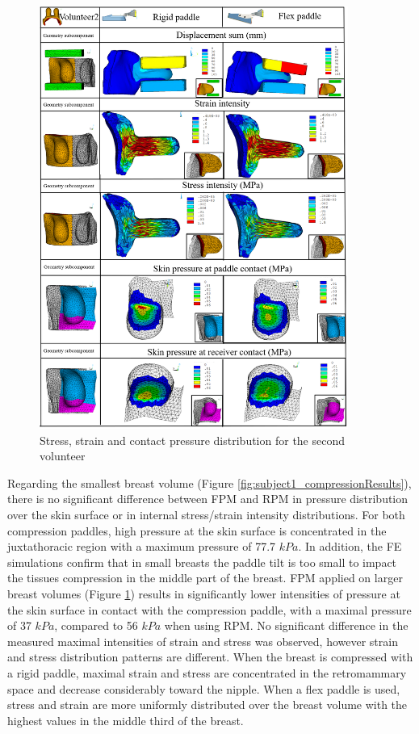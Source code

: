 \begin{figure}[h!]
\centering
\includegraphics[width=0.9\textwidth,keepaspectratio]{figures/subject2_compressionResults.png} 
\caption{Stress, strain and contact pressure distribution for the second volunteer}\label{fig:subject2_compressionResults}
\end{figure}


Regarding the smallest breast volume (Figure \ref{fig:subject1_compressionResults}), there is no significant difference between FPM and RPM in pressure distribution over the skin surface or in internal stress/strain intensity distributions. For both compression paddles, high pressure at the skin surface is concentrated in the juxtathoracic region with a maximum pressure of 77.7 $kPa$. In addition, the FE simulations confirm that in small breasts the paddle tilt is too small to impact the tissues compression in the middle part of the breast. FPM applied on larger breast volumes (Figure \ref{fig:subject2_compressionResults}) results in significantly lower intensities of pressure at the skin surface in contact with the compression paddle, with a maximal pressure of 37 $kPa$, compared to 56 $kPa$ when using RPM. No significant difference in the measured maximal intensities of strain and stress was observed, however strain and stress distribution patterns are different. When the breast is compressed with a rigid paddle, maximal strain and stress are concentrated in the retromammary space and decrease considerably toward the nipple. When a flex paddle is used, stress and strain are more uniformly distributed over the breast volume with the highest values in the middle third of the breast.

